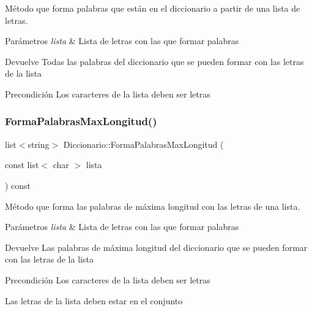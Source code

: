 Método que forma palabras que están en el diccionario a partir de una lista de letras. 


\begin{DoxyParams}{Parámetros}
{\em lista} & Lista de letras con las que formar palabras \\
\hline
\end{DoxyParams}
\begin{DoxyReturn}{Devuelve}
Todas las palabras del diccionario que se pueden formar con las letras de la lista 
\end{DoxyReturn}
\begin{DoxyPrecond}{Precondición}
Los caracteres de la lista deben ser letras 
\end{DoxyPrecond}
\mbox{\label{classDiccionario_ac3ac6036aed4a89b7b8955be2750d1c4}} 
\subsubsection{\texorpdfstring{Forma\+Palabras\+Max\+Longitud()}{FormaPalabrasMaxLongitud()}}
{\footnotesize\ttfamily list$<$string$>$ Diccionario\+::\+Forma\+Palabras\+Max\+Longitud (\begin{DoxyParamCaption}\item[{const list$<$ char $>$}]{lista }\end{DoxyParamCaption}) const}



Método que forma las palabras de máxima longitud con las letras de una lista. 


\begin{DoxyParams}{Parámetros}
{\em lista} & Lista de letras con las que formar palabras \\
\hline
\end{DoxyParams}
\begin{DoxyReturn}{Devuelve}
Las palabras de máxima longitud del diccionario que se pueden formar con las letras de la lista 
\end{DoxyReturn}
\begin{DoxyPrecond}{Precondición}
Los caracteres de la lista deben ser letras 

Las letras de la lista deben estar en el conjunto 
\end{DoxyPrecond}
\mbox{\label{classDiccionario_adfe4d8e5ba24ffae01075505a0ae5e27}} 
